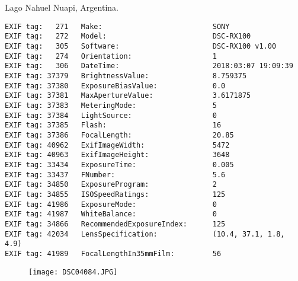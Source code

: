 \section{\protect{}}
\noindent Lago Nahuel Nuapi, Argentina.
\noindent
\begin{lstlisting}
EXIF tag:   271   Make:                          SONY
EXIF tag:   272   Model:                         DSC-RX100
EXIF tag:   305   Software:                      DSC-RX100 v1.00
EXIF tag:   274   Orientation:                   1
EXIF tag:   306   DateTime:                      2018:03:07 19:09:39
EXIF tag: 37379   BrightnessValue:               8.759375
EXIF tag: 37380   ExposureBiasValue:             0.0
EXIF tag: 37381   MaxApertureValue:              3.6171875
EXIF tag: 37383   MeteringMode:                  5
EXIF tag: 37384   LightSource:                   0
EXIF tag: 37385   Flash:                         16
EXIF tag: 37386   FocalLength:                   20.85
EXIF tag: 40962   ExifImageWidth:                5472
EXIF tag: 40963   ExifImageHeight:               3648
EXIF tag: 33434   ExposureTime:                  0.005
EXIF tag: 33437   FNumber:                       5.6
EXIF tag: 34850   ExposureProgram:               2
EXIF tag: 34855   ISOSpeedRatings:               125
EXIF tag: 41986   ExposureMode:                  0
EXIF tag: 41987   WhiteBalance:                  0
EXIF tag: 34866   RecommendedExposureIndex:      125
EXIF tag: 42034   LensSpecification:             (10.4, 37.1, 1.8, 4.9)
EXIF tag: 41989   FocalLengthIn35mmFilm:         56

\end{lstlisting}
\clearpage
\begin{figure}
\raggedleft
\texttt{[image: DSC04084.JPG]}
\end{figure}


\clearpage
